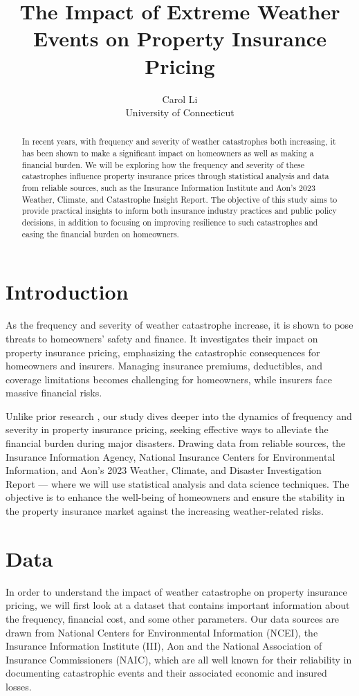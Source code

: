 \documentclass[12pt]{article}
\title{The Impact of Extreme Weather Events on Property Insurance Pricing}
\author{Carol Li\\
    University of Connecticut
}
\begin{document}
\maketitle

\begin{abstract}
    In recent years, with frequency and severity of weather catastrophes both increasing, it has been shown to make a significant impact 
    on homeowners as well as making a financial burden. We will be exploring how the frequency and severity of these catastrophes 
    influence property insurance prices through statistical analysis and data from reliable sources, such as the Insurance Information 
    Institute and Aon's 2023 Weather, Climate, and Catastrophe Insight Report. The objective of this study aims to provide practical 
    insights to inform both insurance industry practices and public policy decisions, in addition to focusing on improving resilience 
    to such catastrophes and easing the financial burden on homeowners.
\end{abstract}


\section{Introduction}
\label{sec:intro}
As the frequency and severity of weather catastrophe increase, it is shown to pose threats to homeowners' safety and finance.
It investigates their impact on property insurance pricing, emphasizing the catastrophic consequences for homeowners and insurers. 
Managing insurance premiums, deductibles, and coverage limitations becomes challenging for homeowners, while insurers face massive 
financial risks.

Unlike prior research \cite{hurricaneeco}, our study dives deeper into the dynamics of frequency and severity in property insurance 
pricing, seeking effective ways to alleviate the financial burden during major disasters. Drawing data from reliable sources,
the Insurance Information Agency, National Insurance Centers for Environmental Information, and Aon's 2023 Weather, Climate, and 
Disaster Investigation Report — where we will use statistical analysis and data science techniques. The objective is to enhance 
the well-being of homeowners and ensure the stability in the property insurance market against the increasing weather-related risks.



\section{Data}
\label{sec:data}
In order to understand the impact of weather catastrophe on property insurance pricing, we will first look at a dataset that 
contains important information about the frequency, financial cost, and some other parameters. Our data sources are drawn from 
National Centers for Environmental Information (NCEI)\cite{ncei}, the Insurance Information Institute (III)\cite{iii}, Aon\cite{aon} 
and the National Association of Insurance Commissioners (NAIC)\cite{naic}, which are all well known for their reliability in 
documenting catastrophic events and their associated economic and insured losses.
\end{document}
